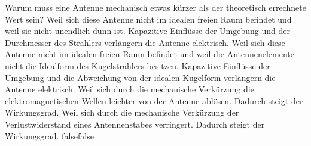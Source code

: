     {Warum muss eine Antenne mechanisch etwas kürzer als der theoretisch errechnete Wert sein?}
    {Weil sich diese Antenne nicht im idealen freien Raum befindet und weil sie nicht unendlich dünn ist. Kapazitive Einflüsse der Umgebung und der Durchmesser des Strahlers verlängern die Antenne elektrisch.}
    {Weil sich diese Antenne nicht im idealen freien Raum befindet und weil die Antennenelemente nicht die Idealform des Kugelstrahlers besitzen. Kapazitive Einflüsse der Umgebung und die Abweichung von der idealen Kugelform verlängern die Antenne elektrisch.}
    {Weil sich durch die mechanische Verkürzung die elektromagnetischen Wellen leichter von der Antenne ablösen. Dadurch steigt der Wirkungsgrad.}
    {Weil sich durch die mechanische Verkürzung der Verlustwiderstand eines Antennenstabes verringert. Dadurch steigt der Wirkungsgrad.}
    {false}{false}